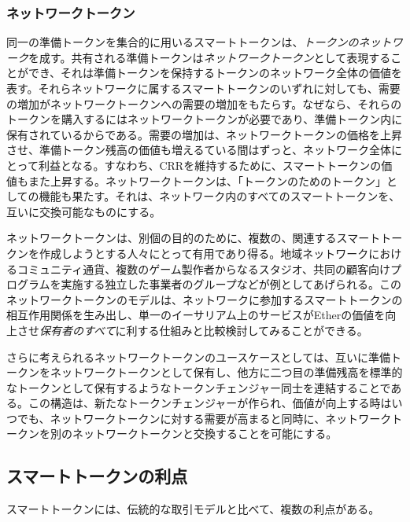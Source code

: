 \documentclass{jsarticle}
\begin{document}
    \subsubsection{ネットワークトークン}

    同一の準備トークンを集合的に用いるスマートトークンは、\emph{トークンのネットワーク}を成す。共有される準備トークンは\emph{ネットワークトークン}として表現することができ、それは準備トークンを保持するトークンのネットワーク全体の価値を表す。それらネットワークに属するスマートトークンのいずれに対しても、需要の増加がネットワークトークンへの需要の増加をもたらす。なぜなら、それらのトークンを購入するにはネットワークトークンが必要であり、準備トークン内に保有されているからである。需要の増加は、ネットワークトークンの価格を上昇させ、準備トークン残高の価値も増えるている間はずっと、ネットワーク全体にとって利益となる。すなわち、CRRを維持するために、スマートトークンの価値もまた上昇する。ネットワークトークンは、「トークンのためのトークン」としての機能も果たす。それは、ネットワーク内のすべてのスマートトークンを、互いに交換可能なものにする。

    ネットワークトークンは、別個の目的のために、複数の、関連するスマートトークンを作成しようとする人々にとって有用であり得る。地域ネットワークにおけるコミュニティ通貨、複数のゲーム製作者からなるスタジオ、共同の顧客向けプログラムを実施する独立した事業者のグループなどが例としてあげられる。このネットワークトークンのモデルは、ネットワークに参加するスマートトークンの相互作用関係を生み出し、単一のイーサリアム上のサービスがEtherの価値を向上させ\emph{保有者のすべて}に利する仕組みと比較検討してみることができる。

    さらに考えられるネットワークトークンのユースケースとしては、互いに準備トークンをネットワークトークンとして保有し、他方に二つ目の準備残高を標準的なトークンとして保有するようなトークンチェンジャー同士を連結することである。この構造は、新たなトークンチェンジャーが作られ、価値が向上する時はいつでも、ネットワークトークンに対する需要が高まると同時に、ネットワークトークンを別のネットワークトークンと交換することを可能にする。

  \subsection{スマートトークンの利点}

  スマートトークンには、伝統的な取引モデルと比べて、複数の利点がある。
\end{document}
